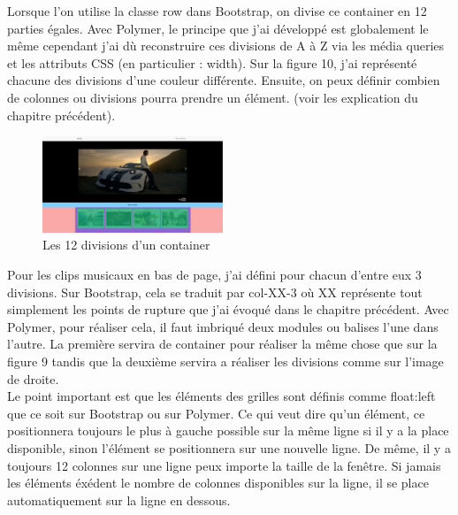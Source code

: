 \documentclass{article}
\begin{document}
Lorsque l'on utilise la classe \og row \fg{} dans Bootstrap, on divise ce container en 12 parties \'egales. Avec Polymer, le principe que j'ai d\'evelopp\'e est globalement le m\^eme cependant j'ai d\`u reconstruire ces divisions de A \`a Z via les m\'edia queries et les attributs CSS (en particulier : width). Sur la figure 10, j'ai repr\'esent\'e chacune des divisions d'une couleur diff\'erente. Ensuite, on peux d\'efinir combien de colonnes ou divisions pourra prendre un \'el\'ement. (voir les explication du chapitre pr\'ec\'edent).\\

\begin{figure}
  \vspace{-25pt}
  \begin{center}
    \includegraphics[width=0.48\textwidth]{p11}
  \end{center}
  \vspace{-20pt}
  \caption{Les 12 divisions d'un container}
  \vspace{-10pt}
\end{figure} 

Pour les clips musicaux en bas de page, j'ai d\'efini pour chacun d'entre eux 3 divisions. Sur Bootstrap, cela se traduit par \og col-XX-3 \fg{} o\`u XX repr\'esente tout simplement les points de rupture que j'ai \'evoqu\'e dans le chapitre pr\'ec\'edent. Avec Polymer, pour r\'ealiser cela, il faut imbriqu\'e deux modules ou balises l'une dans l'autre. La premi\`ere servira de container pour r\'ealiser la m\^eme chose que sur la figure 9 tandis que la deuxi\`eme servira a r\'ealiser les divisions comme sur l'image de droite.\\

Le point important est que les \'el\'ements des grilles sont d\'efinis comme \og float:left \fg{} que ce soit sur Bootstrap ou sur Polymer. Ce qui veut dire qu'un \'el\'ement, ce positionnera toujours le plus \`a gauche possible sur la m\^eme ligne si il y a la place disponible, sinon l'\'el\'ement se positionnera sur une nouvelle ligne. De m\^eme, il y a toujours 12 colonnes sur une ligne peux importe la taille de la fen\^etre. Si jamais les \'el\'ements \'ex\'edent le nombre de colonnes disponibles sur la ligne, il se place automatiquement sur la ligne en dessous.\\
\end{document}
